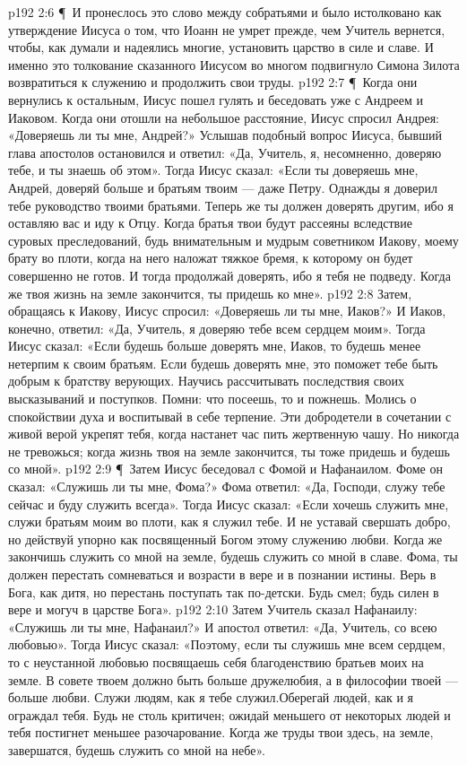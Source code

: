 \vs p192 2:6 \P\ И пронеслось это слово между собратьями и было истолковано как утверждение Иисуса о том, что Иоанн не умрет прежде, чем Учитель вернется, чтобы, как думали и надеялись многие, установить царство в силе и славе. И именно это толкование сказанного Иисусом во многом подвигнуло Симона Зилота возвратиться к служению и продолжить свои труды.
\vs p192 2:7 \P\ Когда они вернулись к остальным, Иисус пошел гулять и беседовать уже с Андреем и Иаковом. Когда они отошли на небольшое расстояние, Иисус спросил Андрея: «Доверяешь ли ты мне, Андрей?» Услышав подобный вопрос Иисуса, бывший глава апостолов остановился и ответил: «Да, Учитель, я, несомненно, доверяю тебе, и ты знаешь об этом». Тогда Иисус сказал: «Если ты доверяешь мне, Андрей, доверяй больше и братьям твоим --- даже Петру. Однажды я доверил тебе руководство твоими братьями. Теперь же ты должен доверять другим, ибо я оставляю вас и иду к Отцу. Когда братья твои будут рассеяны вследствие суровых преследований, будь внимательным и мудрым советником Иакову, моему брату во плоти, когда на него наложат тяжкое бремя, к которому он будет совершенно не готов. И тогда продолжай доверять, ибо я тебя не подведу. Когда же твоя жизнь на земле закончится, ты придешь ко мне».
\vs p192 2:8 Затем, обращаясь к Иакову, Иисус спросил: «Доверяешь ли ты мне, Иаков?» И Иаков, конечно, ответил: «Да, Учитель, я доверяю тебе всем сердцем моим». Тогда Иисус сказал: «Если будешь больше доверять мне, Иаков, то будешь менее нетерпим к своим братьям. Если будешь доверять мне, это поможет тебе быть добрым к братству верующих. Научись рассчитывать последствия своих высказываний и поступков. Помни: что посеешь, то и пожнешь. Молись о спокойствии духа и воспитывай в себе терпение. Эти добродетели в сочетании с живой верой укрепят тебя, когда настанет час пить жертвенную чашу. Но никогда не тревожься; когда жизнь твоя на земле закончится, ты тоже придешь и будешь со мной».
\vs p192 2:9 \P\ Затем Иисус беседовал с Фомой и Нафанаилом. Фоме он сказал: «Служишь ли ты мне, Фома?» Фома ответил: «Да, Господи, служу тебе сейчас и буду служить всегда». Тогда Иисус сказал: «Если хочешь служить мне, служи братьям моим во плоти, как я служил тебе. И не уставай свершать добро, но действуй упорно как посвященный Богом этому служению любви. Когда же закончишь служить со мной на земле, будешь служить со мной в славе. Фома, ты должен перестать сомневаться и возрасти в вере и в познании истины. Верь в Бога, как дитя, но перестань поступать так по\hyp{}детски. Будь смел; будь силен в вере и могуч в царстве Бога».
\vs p192 2:10 Затем Учитель сказал Нафанаилу: «Служишь ли ты мне, Нафанаил?» И апостол ответил: «Да, Учитель, со всею любовью». Тогда Иисус сказал: «Поэтому, если ты служишь мне всем сердцем, то с неустанной любовью посвящаешь себя благоденствию братьев моих на земле. В совете твоем должно быть больше дружелюбия, а в философии твоей --- больше любви. Служи людям, как я тебе служил.Оберегай людей, как и я ограждал тебя. Будь не столь критичен; ожидай меньшего от некоторых людей и тебя постигнет меньшее разочарование. Когда же труды твои здесь, на земле, завершатся, будешь служить со мной на небе».
